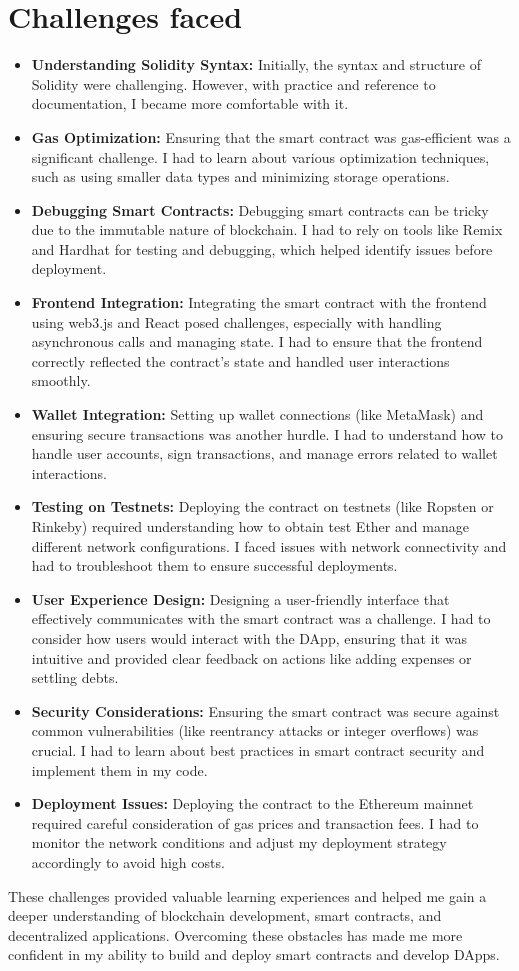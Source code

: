 \documentclass[12pt, a4paper]{article}
\begin{document}
\section{Challenges faced}
\begin{itemize}
    \item \textbf{Understanding Solidity Syntax:} Initially, the syntax and structure of Solidity were challenging. However, with practice and reference to documentation, I became more comfortable with it.
    \item \textbf{Gas Optimization:} Ensuring that the smart contract was gas-efficient was a significant challenge. I had to learn about various optimization techniques, such as using smaller data types and minimizing storage operations.
    \item \textbf{Debugging Smart Contracts:} Debugging smart contracts can be tricky due to the immutable nature of blockchain. I had to rely on tools like Remix and Hardhat for testing and debugging, which helped identify issues before deployment.
    \item \textbf{Frontend Integration:} Integrating the smart contract with the frontend using web3.js and React posed challenges, especially with handling asynchronous calls and managing state. I had to ensure that the frontend correctly reflected the contract's state and handled user interactions smoothly.
    \item \textbf{Wallet Integration:} Setting up wallet connections (like MetaMask) and ensuring secure transactions was another hurdle. I had to understand how to handle user accounts, sign transactions, and manage errors related to wallet interactions.
    \item \textbf{Testing on Testnets:} Deploying the contract on testnets (like Ropsten or Rinkeby) required understanding how to obtain test Ether and manage different network configurations. I faced issues with network connectivity and had to troubleshoot them to ensure successful deployments.
    \item \textbf{User Experience Design:} Designing a user-friendly interface that effectively communicates with the smart contract was a challenge. I had to consider how users would interact with the DApp, ensuring that it was intuitive and provided clear feedback on actions like adding expenses or settling debts.
    \item \textbf{Security Considerations:} Ensuring the smart contract was secure against common vulnerabilities (like reentrancy attacks or integer overflows) was crucial. I had to learn about best practices in smart contract security and implement them in my code.
    \item \textbf{Deployment Issues:} Deploying the contract to the Ethereum mainnet required careful consideration of gas prices and transaction fees. I had to monitor the network conditions and adjust my deployment strategy accordingly to avoid high costs.
\end{itemize}
These challenges provided valuable learning experiences and helped me gain a deeper understanding of blockchain development, smart contracts, and decentralized applications. Overcoming these obstacles has made me more confident in my ability to build and deploy smart contracts and develop DApps.
\end{document}
